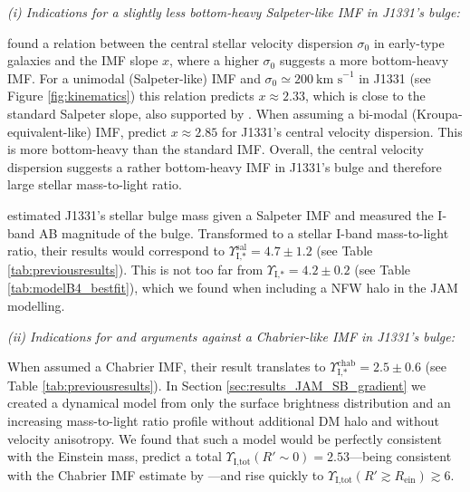 \documentclass[useAMS,usenatbib]{mnras}
\begin{document}
\emph{(i) Indications for a slightly less bottom-heavy Salpeter-like IMF in J1331's bulge:}

\citet{Ferreras} found a relation between the central stellar velocity dispersion $\sigma_0$ in early-type galaxies and the IMF slope $x$, where a higher $\sigma_0$ suggests a more bottom-heavy IMF. For a unimodal (Salpeter-like) IMF and $\sigma_0 \simeq 200~\text{km s}^{-1}$ in J1331 (see Figure \ref{fig:kinematics}) this relation predicts $x \approx 2.33$, which is close to the standard Salpeter slope, also supported by \citet{2014MNRAS.438.1483S}. When assuming a bi-modal (Kroupa-equivalent-like) IMF, \citet{Ferreras} predict $x \approx 2.85$ for J1331's central velocity dispersion. This is more bottom-heavy than the standard \citet{2002Sci...295...82K} IMF. Overall, the central velocity dispersion suggests a rather bottom-heavy IMF in J1331's bulge and therefore large stellar mass-to-light ratio. 

\citet{SWELLSI} estimated J1331's stellar bulge mass given a Salpeter IMF and measured the I-band AB magnitude of the bulge. Transformed to a stellar I-band mass-to-light ratio, their results would correspond to $\Upsilon_\text{I,*}^\text{sal} = 4.7 \pm 1.2$ (see Table \ref{tab:previousresults}). This is not too far from $\Upsilon_\text{I,*} = 4.2 \pm 0.2$ (see Table \ref{tab:modelB4_bestfit}), which we found when including a NFW halo in the JAM modelling.

\emph{(ii) Indications for and arguments against a Chabrier-like IMF in J1331's bulge:}

When \citet{SWELLSI} assumed a Chabrier IMF, their result translates to $\Upsilon_\text{I,*}^\text{chab} = 2.5 \pm 0.6$ (see Table \ref{tab:previousresults}). In Section \ref{sec:results_JAM_SB_gradient} we created a dynamical model from only the surface brightness distribution and an increasing mass-to-light ratio profile without additional DM halo and without velocity anisotropy. We found that such a model would be perfectly consistent with the Einstein mass, predict a total $\Upsilon_\text{I,tot}(R'\sim0) = 2.53$---being consistent with the Chabrier IMF estimate by \citet{SWELLSI}---and rise quickly to $\Upsilon_\text{I,tot}(R'\gtrsim R_\text{ein}) \gtrsim 6$. 
\end{document}
